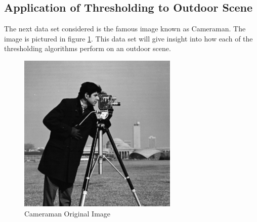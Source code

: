 \documentclass[journal]{IEEEtran}
\begin{document}
\subsection{Application of Thresholding to Outdoor Scene}
\par The next data set considered is the famous image known as Cameraman. The image is pictured in figure \ref{fig:cameraman}. This data set will give insight into how each of the thresholding algorithms perform on an outdoor scene.

\begin{figure}[!h]
\centering
\includegraphics[width=3in]{../images/cameraman.png}
\caption{Cameraman Original Image}
\label{fig:cameraman}
\end{figure}
\end{document}
